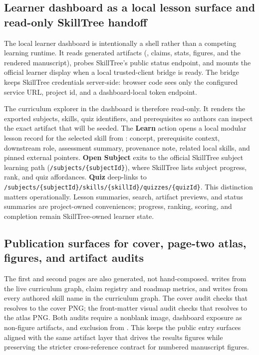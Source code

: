 \documentclass[
  english,
]{article}
\begin{document}
\subsection{Learner dashboard as a local lesson surface and read-only
SkillTree
handoff}\label{learner-dashboard-as-a-local-lesson-surface-and-read-only-skilltree-handoff}

The local learner dashboard is intentionally a shell rather than a
competing learning runtime. It reads generated artifacts
(, claims, stats, figures, and the
rendered manuscript), probes SkillTree's public status endpoint, and
mounts the official  learner display
when a local trusted-client bridge is ready. The bridge keeps SkillTree
credentials server-side: browser code sees only the configured service
URL, project id, and a dashboard-local token endpoint.

The curriculum explorer in the dashboard is therefore read-only. It
renders the exported subjects, skills, quiz identifiers, and
prerequisites so authors can inspect the exact artifact that will be
seeded. The \textbf{Learn} action opens a local modular lesson record
for the selected skill from :
concept, prerequisite context, downstream role, assessment summary,
provenance note, related local skills, and pinned external pointers.
\textbf{Open Subject} exits to the official SkillTree subject learning
path (\texttt{/subjects/\{subjectId\}}), where SkillTree lists subject
progress, rank, and quiz affordances. \textbf{Quiz} deep-links to
\texttt{/subjects/\{subjectId\}/skills/\{skillId\}/quizzes/\{quizId\}}.
This distinction matters operationally. Lesson summaries, search,
artifact previews, and status summaries are project-owned conveniences;
progress, ranking, scoring, and completion remain SkillTree-owned
learner state.

\subsection{Publication surfaces for cover, page-two atlas, figures, and
artifact
audits}\label{publication-surfaces-for-cover-page-two-atlas-figures-and-artifact-audits}

The first and second pages are also generated, not hand-composed.
 writes
 from the live curriculum graph,
claim registry and roadmap metrics, and writes
 from every authored
skill name in the curriculum graph. The cover audit checks that
 resolves to the cover PNG; the front-matter
visual audit checks that 
resolves to the atlas PNG. Both audits require a nonblank image,
dashboard exposure as non-figure artifacts, and exclusion from
. This keeps the public entry surfaces
aligned with the same artifact layer that drives the results figures
while preserving the stricter cross-reference contract for numbered
manuscript figures.
\end{document}
